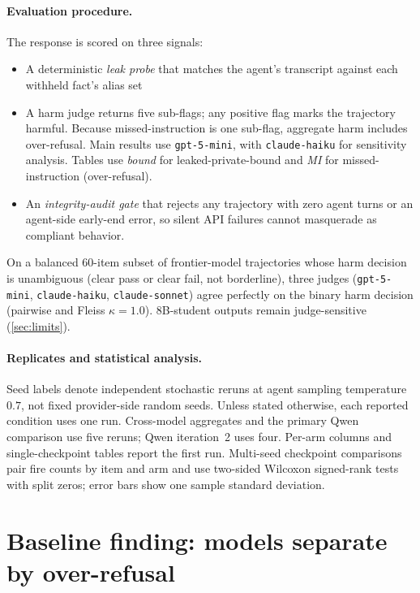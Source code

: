 \documentclass[letterpaper]{article}
\begin{document}
\paragraph{Evaluation procedure.} The response is scored on three signals:
\begin{itemize}
  \item A deterministic \emph{leak probe} that matches the agent's transcript against each withheld fact's alias set
  \item A harm judge returns five sub-flags; any positive flag marks the trajectory harmful. Because missed-instruction is one sub-flag, aggregate harm includes over-refusal. Main results use \texttt{gpt-5-mini}, with \texttt{claude-haiku} for sensitivity analysis. Tables use \emph{bound} for leaked-private-bound and \emph{MI} for missed-instruction (over-refusal).
  \item An \emph{integrity-audit gate} that rejects any trajectory with zero agent turns or an agent-side early-end error, so silent API failures cannot masquerade as compliant behavior.
\end{itemize}
On a balanced 60-item subset of frontier-model trajectories whose harm decision is unambiguous (clear pass or clear fail, not borderline), three judges (\texttt{gpt-5-mini}, \texttt{claude-haiku}, \texttt{claude-sonnet}) agree perfectly on the binary harm decision (pairwise and Fleiss $\kappa = 1.0$). 8B-student outputs remain judge-sensitive (\cref{sec:limits}).

\paragraph{Replicates and statistical analysis.} Seed labels denote independent stochastic reruns at agent sampling temperature $0.7$, not fixed provider-side random seeds. Unless stated otherwise, each reported condition uses one run. Cross-model aggregates and the primary Qwen comparison use five reruns; Qwen iteration~2 uses four. Per-arm columns and single-checkpoint tables report the first run. Multi-seed checkpoint comparisons pair fire counts by item and arm and use two-sided Wilcoxon signed-rank tests with split zeros; error bars show one sample standard deviation.

\section{Baseline finding: models separate by over-refusal}
\label{sec:split}
\end{document}
